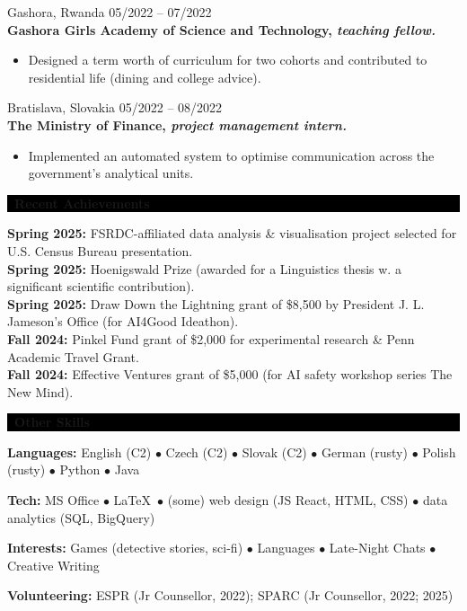 \documentclass[10pt]{article}
\begin{document}
\vspace{0.1in}
Gashora, Rwanda \hfill 05/2022 – 07/2022\\
\textbf{Gashora Girls Academy of Science and Technology, \textit{teaching fellow.}}
\begin{itemize}[label=$\blacktriangleright$, leftmargin=20pt, topsep=0pt, itemsep=0pt]
\item Designed a term worth of curriculum for two cohorts and contributed to residential life (dining and college advice).
\end{itemize}
\vspace{0.1in}
Bratislava, Slovakia \hfill 05/2022 – 08/2022\\
\textbf{The Ministry of Finance, \textit{project management intern.}}
\begin{itemize}[label=$\blacktriangleright$, leftmargin=20pt, topsep=0pt, itemsep=0pt]
\item Implemented an automated system to optimise communication across the government's analytical units.\\
\end{itemize}
\noindent\colorbox{black}{\parbox{\textwidth}{\color{white}\textbf{\faSeedling\ Recent Achievements}}}

\textbf{Spring 2025:} FSRDC-affiliated data analysis \& visualisation project selected for U.S. Census Bureau presentation.\\
\textbf{Spring 2025:}	Hoenigswald Prize (awarded for a Linguistics thesis w. a significant scientific contribution).\\
\textbf{Spring 2025:} 	Draw Down the Lightning grant of \$8,500 by President J. L. Jameson’s Office (for AI4Good Ideathon).\\
\textbf{Fall 2024: }	Pinkel Fund grant of \$2,000 for experimental research \& Penn Academic Travel Grant.\\
\textbf{Fall 2024: }	Effective Ventures grant of \$5,000 (for AI safety workshop series The New Mind).\\

\noindent\colorbox{black}{\parbox{\textwidth}{\color{white}\textbf{\faLightbulb\ Other Skills}}}
\textbf{Languages:} English (C2) $\bullet$ Czech (C2) $\bullet$ Slovak (C2) $\bullet$ German (rusty) $\bullet$ Polish (rusty) $\bullet$ Python $\bullet$ Java

\textbf{Tech:} MS Office $\bullet$ \LaTeX\ $\bullet$ (some) web design (JS React, HTML, CSS) $\bullet$ data analytics (SQL, BigQuery)

\textbf{Interests:} Games (detective stories, sci-fi) $\bullet$ Languages $\bullet$ Late-Night Chats $\bullet$ Creative Writing

\textbf{Volunteering:} ESPR (Jr Counsellor, 2022); SPARC (Jr Counsellor, 2022; 2025)
\end{document}
